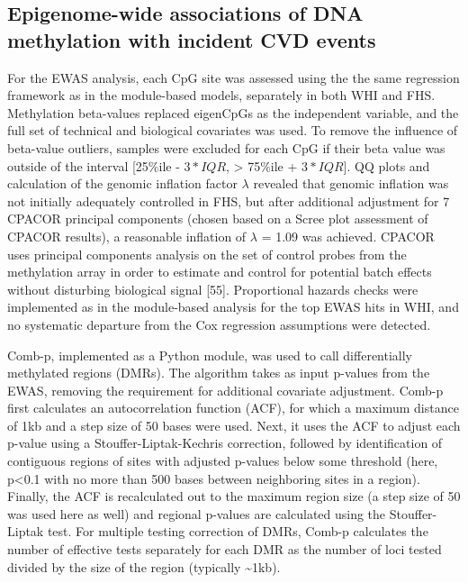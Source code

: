 \documentclass[]{bmcart}
\theoremstyle{definition}
\theoremstyle{definition}
\theoremstyle{definition}
\theoremstyle{remark}
\begin{document}
\subsection{Epigenome-wide associations of DNA methylation with incident
CVD
events}\label{epigenome-wide-associations-of-dna-methylation-with-incident-cvd-events}

For the EWAS analysis, each CpG site was assessed using the the same
regression framework as in the module-based models, separately in both
WHI and FHS. Methylation beta-values replaced eigenCpGs as the
independent variable, and the full set of technical and biological
covariates was used. To remove the influence of beta-value outliers,
samples were excluded for each CpG if their beta value was outside of
the interval {[}25\%ile - \(3*IQR\), \textgreater{} 75\%ile +
\(3*IQR\){]}. QQ plots and calculation of the genomic inflation factor
\(\lambda\) revealed that genomic inflation was not initially adequately
controlled in FHS, but after additional adjustment for 7 CPACOR
principal components (chosen based on a Scree plot assessment of CPACOR
results), a reasonable inflation of \(\lambda\) = 1.09 was achieved.
CPACOR uses principal components analysis on the set of control probes
from the methylation array in order to estimate and control for
potential batch effects without disturbing biological signal {[}55{]}.
Proportional hazards checks were implemented as in the module-based
analysis for the top EWAS hits in WHI, and no systematic departure from
the Cox regression assumptions were detected.

Comb-p, implemented as a Python module, was used to call differentially
methylated regions (DMRs). The algorithm takes as input p-values from
the EWAS, removing the requirement for additional covariate adjustment.
Comb-p first calculates an autocorrelation function (ACF), for which a
maximum distance of 1kb and a step size of 50 bases were used. Next, it
uses the ACF to adjust each p-value using a Stouffer-Liptak-Kechris
correction, followed by identification of contiguous regions of sites
with adjusted p-values below some threshold (here, p\textless{}0.1 with
no more than 500 bases between neighboring sites in a region). Finally,
the ACF is recalculated out to the maximum region size (a step size of
50 was used here as well) and regional p-values are calculated using the
Stouffer-Liptak test. For multiple testing correction of DMRs, Comb-p
calculates the number of effective tests separately for each DMR as the
number of loci tested divided by the size of the region (typically
\textasciitilde{}1kb).
\end{document}
